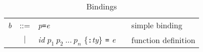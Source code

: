 \documentclass[11pt]{article}
\begin{document}
\begin{table}[h]
\centering\narrowlines\normalsize
\begin{tabular}{|rcp{50mm}p{5mm}p{52mm}|}  \hline
{\it b} & ::= & {\it p{\tt =}e}       	& & simple binding \\
  &  $|$  & {\it id\/} $p_{1}\ p_{2}\ \ldots\ p_{n}$
            \{{\tt :}{\it ty}\} {\tt =} {\it e}
                                     	& & function definition \\
\hline
\end{tabular}
\caption{Bindings}
\label{tab:ml-bindings}
\end{table}
\end{document}
